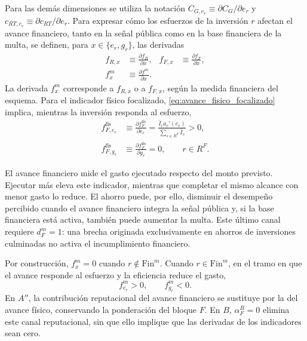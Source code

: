 Para las demás dimensiones se utiliza la notación \(C_{G,e_r}\equiv\partial C_G/\partial e_r\) y \(c_{RT,e_r}\equiv\partial c_{RT}/\partial e_r\). Para expresar cómo los esfuerzos de la inversión \(r\) afectan el avance financiero, tanto en la señal pública como en la base financiera de la multa, se definen, para \(x\in\{e_r,g_r\}\), las derivadas
\begin{equation}
\label{eq:derivadas_avance_financiero}
\begin{aligned}
f_{R,x}&\equiv\frac{\partial f_R}{\partial x},
& f_{F,x}&\equiv\frac{\partial f_F}{\partial x},\\
f_x^m&\equiv\frac{\partial f^m}{\partial x}.
\end{aligned}
\end{equation}
La derivada \(f_x^m\) corresponde a \(f_{R,x}\) o a \(f_{F,x}\), según la medida financiera del esquema. Para el indicador físico focalizado, \eqref{eq:avance_fisico_focalizado} implica, mientras la inversión responda al esfuerzo,
\begin{equation}
\label{eq:derivadas_avance_fisico_focalizado}
\begin{aligned}
f_{F,e_r}^{\mathrm{fis}}
&\equiv\frac{\partial f_F^{\mathrm{fis}}}{\partial e_r}
=\frac{\bar I_r a_r'(e_r)}{\sum_{s\in R^F}\bar I_s}>0,
\\
f_{F,g_r}^{\mathrm{fis}}
&\equiv\frac{\partial f_F^{\mathrm{fis}}}{\partial g_r}=0,
\qquad r\in R^F.
\end{aligned}
\end{equation}

El avance financiero mide el gasto ejecutado respecto del monto previsto. Ejecutar más eleva este indicador, mientras que completar el mismo alcance con menor gasto lo reduce. El ahorro puede, por ello, disminuir el desempeño percibido cuando el avance financiero integra la señal pública y, si la base financiera está activa, también puede aumentar la multa. Este último canal requiere \(d_F^m=1\): una brecha originada exclusivamente en ahorros de inversiones culminadas no activa el incumplimiento financiero.

Por construcción, \(f_x^m=0\) cuando \(r\notin\mathrm{Fin}^m\). Cuando \(r\in\mathrm{Fin}^m\), en el tramo en que el avance responde al esfuerzo y la eficiencia reduce el gasto,
\begin{equation}
\label{eq:signos_avance_financiero}
f_{e_r}^m>0,
\qquad
f_{g_r}^m<0.
\end{equation}
En \(A''\), la contribución reputacional del avance financiero se sustituye por la del avance físico, conservando la ponderación del bloque \(F\). En \(B\), \(\alpha_F^B=0\) elimina este canal reputacional, sin que ello implique que las derivadas de los indicadores sean cero.

